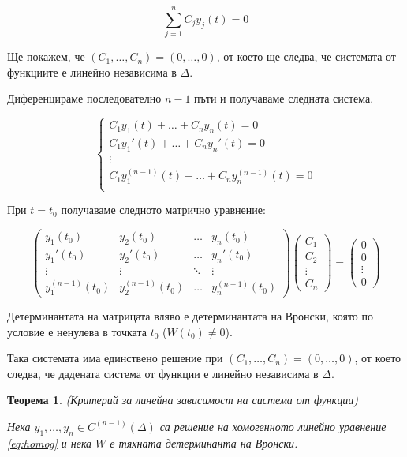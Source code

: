 \documentclass{scrartcl}
\newtheorem{theorem}{Теорема}
\begin{document}
\begin{FlushLeft}
$$\sum_{j=1}^n C_jy_j(t) = 0$$

Ще покажем, че $(C_1, \dots, C_n) = (0, \dots, 0)$, от което ще следва, че системата от функциите е линейно независима в $\Delta$.

Диференцираме последователно $n-1$ пъти и получаваме следната система.

$$
\begin{cases}
    C_1y_1(t) + \dots + C_ny_n(t) = 0\\
    C_1y_1'(t) + \dots + C_ny_n'(t) = 0\\
    \vdots\\
    C_1y_1^{(n-1)}(t) + \dots + C_ny_n^{(n-1)}(t) = 0\\
\end{cases}
$$

При $t = t_0$ получаваме следното матрично уравнение:

$$
\begin{pmatrix}
    y_1(t_0) & y_2(t_0) & \dots & y_n(t_0) \\
    y_1'(t_0) & y_2'(t_0) & \dots & y_n'(t_0) \\
    \vdots & \vdots & \ddots & \vdots \\
    y_1^{(n-1)}(t_0) & y_2^{(n-1)}(t_0) & \dots & y_n^{(n-1)}(t_0)
\end{pmatrix}
\begin{pmatrix}
    C_1\\
    C_2\\
    \vdots\\
    C_n
\end{pmatrix}
=
\begin{pmatrix}
    0\\
    0\\
    \vdots\\
    0
\end{pmatrix}
$$

Детерминантата на матрицата вляво е детерминантата на Вронски, която по условие е ненулева в точката $t_0$ ($W(t_0) \ne 0$).

Така системата има единствено решение при $(C_1, \dots, C_n) = (0, \dots, 0)$, от което следва, че дадената система от функции е линейно независима в $\Delta$.

\begin{theorem}
(Критерий за линейна зависимост на система от функции)

Нека $y_1, \dots, y_n \in C^{(n-1)}(\Delta)$ са решение на хомогенното линейно уравнение \eqref{eq:homog} и нека $W$ е тяхната детерминанта на Вронски.


\end{theorem}
\end{FlushLeft}
\end{document}

